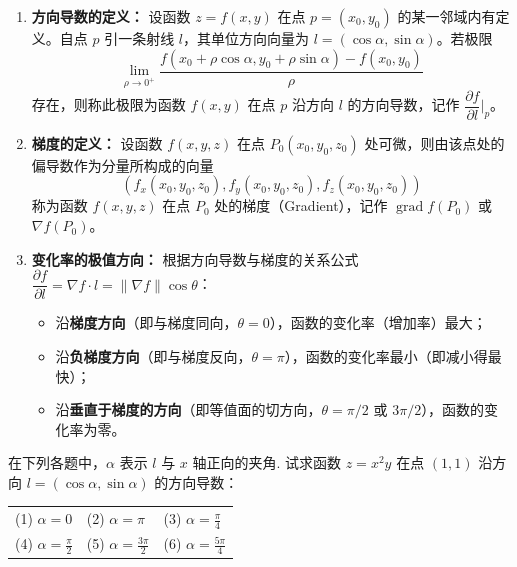 \documentclass[lang=cn,11pt]{elegantbook}
\begin{document}
\begin{solution}
\begin{enumerate}
  \item[(1)] \textbf{方向导数的定义：}
  设函数 $z=f(x,y)$ 在点 $p=(x_0,y_0)$ 的某一邻域内有定义。自点 $p$ 引一条射线 $l$，其单位方向向量为 $l=(\cos\alpha, \sin\alpha)$。若极限
  \[ \lim_{\rho \to 0^+} \frac{f(x_0+\rho\cos\alpha, y_0+\rho\sin\alpha) - f(x_0,y_0)}{\rho} \]
  存在，则称此极限为函数 $f(x,y)$ 在点 $p$ 沿方向 $l$ 的方向导数，记作 $\dfrac{\partial f}{\partial l}\bigg|_p$。

  \item[(2)] \textbf{梯度的定义：}
  设函数 $f(x,y,z)$ 在点 $P_0(x_0,y_0,z_0)$ 处可微，则由该点处的偏导数作为分量所构成的向量
  \[ \left( f_x(x_0,y_0,z_0), f_y(x_0,y_0,z_0), f_z(x_0,y_0,z_0) \right) \]
  称为函数 $f(x,y,z)$ 在点 $P_0$ 处的梯度（Gradient），记作 $\operatorname{grad}f(P_0)$ 或 $\nabla f(P_0)$。

  \item[(3)] \textbf{变化率的极值方向：}
  根据方向导数与梯度的关系公式 $\dfrac{\partial f}{\partial l} = \nabla f \cdot l = \|\nabla f\| \cos\theta$：
  \begin{itemize}
    \item 沿\textbf{梯度方向}（即与梯度同向，$\theta=0$），函数的变化率（增加率）最大；
    \item 沿\textbf{负梯度方向}（即与梯度反向，$\theta=\pi$），函数的变化率最小（即减小得最快）；
    \item 沿\textbf{垂直于梯度的方向}（即等值面的切方向，$\theta=\pi/2$ 或 $3\pi/2$），函数的变化率为零。
  \end{itemize}
\end{enumerate}
\end{solution}

\begin{exercise}[利用方向角计算方向导数]
在下列各题中，$\alpha$ 表示 $l$ 与 $x$ 轴正向的夹角. 试求函数 $z=x^2y$ 在点 $(1,1)$ 沿方向 $l=(\cos\alpha,\sin\alpha)$ 的方向导数：\\
\begin{tabular}{p{} p{} p{}}
(1) $\alpha=0$ & (2) $\alpha=\pi$ & (3) $\alpha=\frac{\pi}{4}$ \\
(4) $\alpha=\frac{\pi}{2}$ & (5) $\alpha=\frac{3\pi}{2}$ & (6) $\alpha=\frac{5\pi}{4}$
\end{tabular}
\end{exercise}
\end{document}
